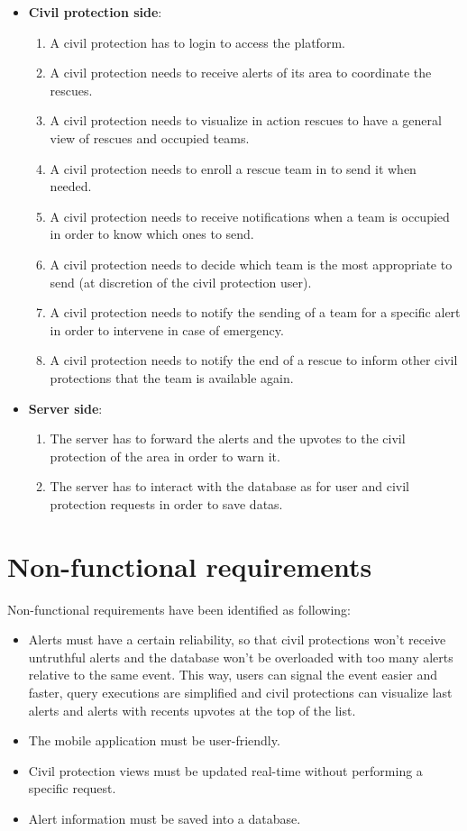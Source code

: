 \documentclass[a4paper,12pt]{report}
\begin{document}
\begin{itemize}
\item \textbf{Civil protection side}:
\begin{enumerate}
\item A civil protection has to login to access the platform.
\item A civil protection needs to receive alerts of its area to coordinate the rescues.
\item A civil protection needs to visualize in action rescues to have a general view of rescues and occupied teams.
\item A civil protection needs to enroll a rescue team in to send it when needed.
\item A civil protection needs to receive notifications when a team is occupied in order to know which ones to send.
\item A civil protection needs to decide which team is the most appropriate to send (at discretion of the civil protection user).
\item A civil protection needs to notify the sending of a team for a specific alert in order to intervene in case of emergency.
\item A civil protection needs to notify the end of a rescue to inform other civil protections that the team is available again.
\end{enumerate}
\end{itemize}

\begin{itemize}
\item \textbf{Server side}:
\begin{enumerate}
\item The server has to forward the alerts and the upvotes to the civil protection of the area in order to warn it.
\item The server has to interact with the database as for user and civil protection requests in order to save datas. 
\end{enumerate}
\end{itemize}

\section{Non-functional requirements}
Non-functional requirements have been identified as following:

\begin{itemize}
\item Alerts must have a certain reliability, so that civil protections won't receive untruthful alerts and the database won't be overloaded with too many alerts relative to the same event. This way, users can signal the event easier and faster, query executions are simplified and civil protections can visualize last alerts and alerts with recents upvotes at the top of the list.
\item The mobile application must be user-friendly.
\item Civil protection views must be updated real-time without performing a specific request.
\item Alert information must be saved into a database.
\end{itemize}
\end{document}
